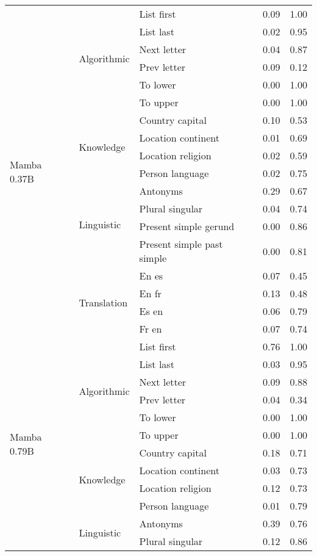 \begin{center}
\begin{longtable}{lllrr}
\cline{1-5} \cline{2-5}
\multirow[t]{18}{*}{Mamba 0.37B} & \multirow[t]{6}{*}{Algorithmic} & List first & 0.09 & 1.00 \\
 &  & List last & 0.02 & 0.95 \\
 &  & Next letter & 0.04 & 0.87 \\
 &  & Prev letter & 0.09 & 0.12 \\
 &  & To lower & 0.00 & 1.00 \\
 &  & To upper & 0.00 & 1.00 \\
\cline{2-5}
 & \multirow[t]{4}{*}{Knowledge} & Country capital & 0.10 & 0.53 \\
 &  & Location continent & 0.01 & 0.69 \\
 &  & Location religion & 0.02 & 0.59 \\
 &  & Person language & 0.02 & 0.75 \\
\cline{2-5}
 & \multirow[t]{4}{*}{Linguistic} & Antonyms & 0.29 & 0.67 \\
 &  & Plural singular & 0.04 & 0.74 \\
 &  & Present simple gerund & 0.00 & 0.86 \\
 &  & Present simple past simple & 0.00 & 0.81 \\
\cline{2-5}
 & \multirow[t]{4}{*}{Translation} & En es & 0.07 & 0.45 \\
 &  & En fr & 0.13 & 0.48 \\
 &  & Es en & 0.06 & 0.79 \\
 &  & Fr en & 0.07 & 0.74 \\
\cline{1-5} \cline{2-5}
\multirow[t]{18}{*}{Mamba 0.79B} & \multirow[t]{6}{*}{Algorithmic} & List first & 0.76 & 1.00 \\
 &  & List last & 0.03 & 0.95 \\
 &  & Next letter & 0.09 & 0.88 \\
 &  & Prev letter & 0.04 & 0.34 \\
 &  & To lower & 0.00 & 1.00 \\
 &  & To upper & 0.00 & 1.00 \\
\cline{2-5}
 & \multirow[t]{4}{*}{Knowledge} & Country capital & 0.18 & 0.71 \\
 &  & Location continent & 0.03 & 0.73 \\
 &  & Location religion & 0.12 & 0.73 \\
 &  & Person language & 0.01 & 0.79 \\
\cline{2-5}
 & \multirow[t]{4}{*}{Linguistic} & Antonyms & 0.39 & 0.76 \\
 &  & Plural singular & 0.12 & 0.86 \\

\end{longtable}
\end{center}
